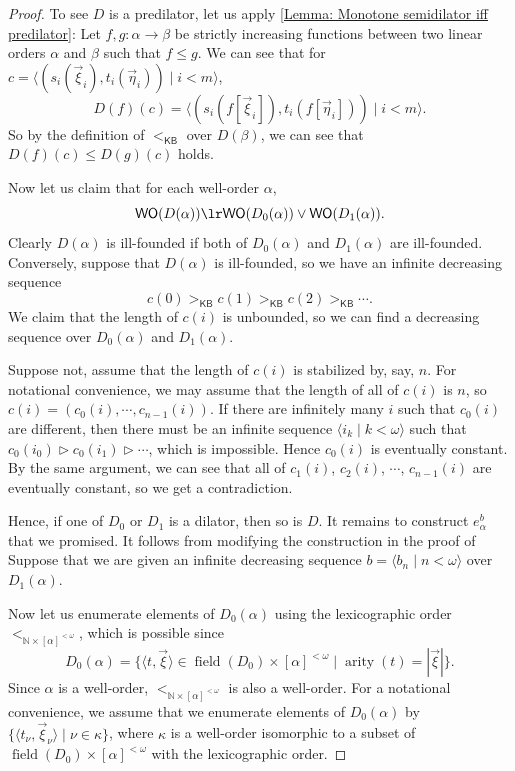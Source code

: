 \documentclass{mhkr}
\newcommand{\added}[1]{#1}
\newcommand{\lag}{\langle}
\newcommand{\rag}{\rangle}
\newcommand{\bbN}{\mathbb{N}}
\newcommand{\field}{\operatorname{field}}
\newcommand{\arity}{\operatorname{arity}}
\newcommand{\WO}{\mathsf{WO}}
\newcommand{\KB}{\mathsf{KB}}
\begin{document}
\begin{proof}
    To see $D$ is a predilator, let us apply \autoref{Lemma: Monotone semidilator iff predilator}: Let $f,g\colon \alpha\to\beta$ be strictly increasing functions between two linear orders $\alpha$ and $\beta$ such that $f\le g$. We can see that for $c=\lag(s_i(\vec{\xi}_i), t_i(\vec{\eta}_i)) \mid i<m\rag$,
    \begin{equation*}
        D(f)(c) = \lag(s_i(f[\vec{\xi}_i]), t_i(f[\vec{\eta}_i])) \mid i<m\rag.
    \end{equation*}
    So by the definition of $<_\KB$ over $D(\beta)$, we can see that $D(f)(c)\le D(g)(c)$ holds. 
    
    Now let us claim that for each well-order $\alpha$,
    \begin{equation*}
        \WO(D(\alpha))\lr \WO(D_0(\alpha))\lor \WO(D_1(\alpha)).
    \end{equation*}
    Clearly $D(\alpha)$ is ill-founded if both of $D_0(\alpha)$ and $D_1(\alpha)$ are ill-founded. Conversely, suppose that $D(\alpha)$ is ill-founded, so we have an infinite decreasing sequence
    \begin{equation*}
        c(0) >_\KB c(1) >_\KB c(2) >_\KB \cdots.
    \end{equation*}
    We claim that the length of $c(i)$ is unbounded, so we can find a decreasing sequence over $D_0(\alpha)$ and $D_1(\alpha)$.
    
    Suppose not, assume that the length of $c(i)$ is stabilized by, say, $n$. For notational convenience, we may assume that the length of all of $c(i)$ is $n$, so $c(i) = (c_0(i),\cdots, c_{n-1}(i))$. If there are infinitely many $i$ such that $c_0(i)$ are different, then there must be an infinite sequence $\lag i_k\mid k<\omega\rag$ such that $c_0(i_0) \vartriangleright c_0(i_1) \vartriangleright \cdots$, which is impossible. Hence $c_0(i)$ is eventually constant. By the same argument, we can see that all of $c_1(i)$, $c_2(i)$, $\cdots$, $c_{n-1}(i)$ are eventually constant, so we get a contradiction. 
    
    Hence, if one of $D_0$ or $D_1$ is a dilator, then so is $D$.
    It remains to construct $e^b_\alpha$ \added{that} we promised. It follows from modifying the construction in the proof of \cite[Lemma 5.2]{PakhomovWalsh2023omegaReflection}
    Suppose that we are given an infinite decreasing sequence $b=\lag b_n \mid n<\omega \rag$ over $D_1(\alpha)$. 
    
    Now let us enumerate elements of $D_0(\alpha)$ using the lexicographic order $<_{\bbN\times [\alpha]^{<\omega}}$, which is possible since
    \begin{equation*}
        D_0(\alpha) = \{\lag t, \vec{\xi}\rag\in \field(D_0)\times [\alpha]^{<\omega}\mid \arity(t) = |\vec{\xi}|\}.
    \end{equation*}
    Since $\alpha$ is a well-order, $<_{\bbN\times [\alpha]^{<\omega}}$ is also a well-order. For a notational convenience, we assume that we enumerate elements of $D_0(\alpha)$ by $\{\lag t_\nu,\vec{\xi}_\nu\rag\mid \nu \in \kappa\}$, where $\kappa$ is a well-order isomorphic to a subset of $\field(D_0)\times[\alpha]^{<\omega}$ with the lexicographic order.


\end{proof}
\end{document}
